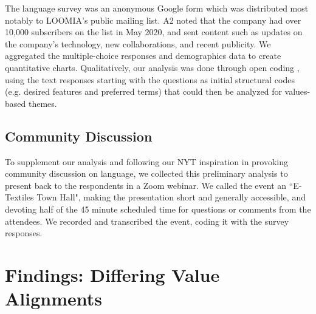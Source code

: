 The language survey was an anonymous Google form which was distributed most notably to LOOMIA's public mailing list. A2 noted that the company had over 10,000 subscribers on the list in May 2020, and sent content such as updates on the company's technology, new collaborations, and recent publicity.
We aggregated the multiple-choice responses and demographics data to create quantitative charts. Qualitatively, our analysis was done through open coding \cite{denzin_sage_2005}, using the text responses starting with the questions as initial structural codes (e.g. desired features and preferred terms) that could then be analyzed for values-based themes. 

\subsection{Community Discussion}

To supplement our analysis and following our NYT inspiration in provoking community discussion on language, we collected this preliminary analysis to present back to the respondents in a Zoom webinar. We called the event an ``E-Textiles Town Hall", making the presentation short and generally accessible, and devoting half of the 45 minute scheduled time for questions or comments from the attendees. We recorded and transcribed the event, coding it with the survey responses. %

\section{Findings: Differing Value Alignments}

